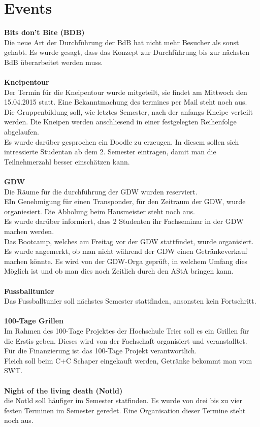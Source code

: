 \documentclass[a4paper, 11pt]{article} %
\begin{document}
\section{Events}
\textbf{Bits don't Bite (BDB)} \\
Die neue Art der Durchführung der BdB hat nicht mehr Besucher als sonst gehabt. Es wurde gesagt, dass das Konzept zur Durchführung bis zur nächsten BdB überarbeitet werden muss. \\
\\
\textbf{Kneipentour} \\
Der Termin für die Kneipentour wurde mitgeteilt, sie findet am Mittwoch den 15.04.2015 statt. Eine Bekanntmachung des termines per Mail steht noch aus.\\
Die Gruppenbildung soll, wie letztes Semester, nach der anfangs Kneipe verteilt werden. Die Kneipen werden anschliesend in einer festgelegten Reihenfolge abgelaufen. \\
Es wurde darüber gesprochen ein Doodle zu erzeugen. In diesem sollen sich intressierte Studentan ab dem 2. Semester eintragen, damit man die Teilnehmerzahl besser einschätzen kann. \\
\\
\textbf{GDW} \\
Die Räume für die durchführung der GDW wurden reserviert. \\
EIn Genehmigung für einen Transponder, für den Zeitraum der GDW, wurde organiesiert. Die Abholung beim Hausmeister steht noch aus. \\
Es wurde darüber informiert, dass 2 Studenten ihr Fachseminar in der GDW machen werden. \\
Das Bootcamp, welches am Freitag vor der GDW stattfindet, wurde organisiert. \\
Es wurde angemerkt, ob man nicht während der GDW einen Getränkeverkauf machen könnte. Es wird von der GDW-Orga geprüft, in welchem Umfang dies Möglich ist und ob man dies noch Zeitlich durch den AStA bringen kann. \\
\\
\textbf{Fussballtunier} \\
Das Fussballtunier soll nächstes Semester stattfinden, ansonsten kein Fortschritt. \\
\\
\textbf{100-Tage Grillen} \\
Im Rahmen des 100-Tage Projektes der Hochschule Trier soll es ein Grillen für die Erstis geben. Dieses wird von der Fachschaft organisiert und veranstalltet. Für die Finanzierung ist das 100-Tage Projekt verantwortlich. \\
Fleich soll beim C+C Schaper eingekauft werden, Getränke bekommt man vom SWT.\\
\\
\textbf{Night of the living death (Notld)} \\
die Notld soll häufiger im Semester statfinden. Es wurde von drei bis zu vier festen Terminen im Semester geredet. Eine Organisation dieser Termine steht noch aus. \\
\end{document}
